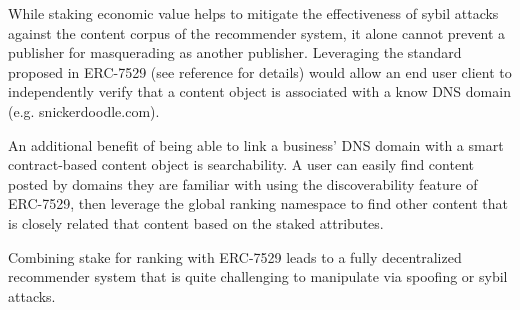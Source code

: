 While staking economic value helps to mitigate the effectiveness of sybil attacks against the content corpus of the recommender system, it alone cannot prevent a publisher for masquerading as another publisher. Leveraging the standard proposed in ERC-7529 (see reference \cite{chapman2023erc7529} for details) would allow an end user client to independently verify that a content object is associated with a know DNS domain (e.g. snickerdoodle.com). 

An additional benefit of being able to link a business' DNS domain with a smart contract-based content object is searchability. A user can easily find content posted by domains they are familiar with using the discoverability feature of ERC-7529, then leverage the global ranking namespace to find other content that is closely related that content based on the staked attributes. 

Combining stake for ranking with ERC-7529 leads to a fully decentralized recommender system that is quite challenging to manipulate via spoofing or sybil attacks. 